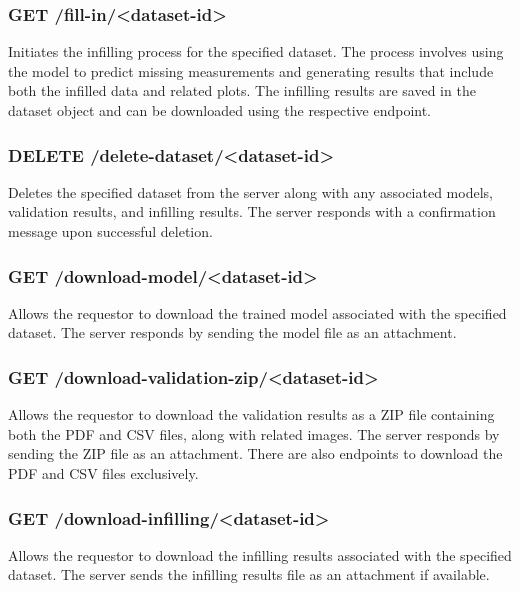 \subsubsection*{GET /fill-in/<dataset-id>}

Initiates the infilling process for the specified dataset.
The process involves using the model to predict missing measurements and generating results that include both the infilled data and related plots.
The infilling results are saved in the dataset object and can be downloaded using the respective endpoint.

\subsubsection*{DELETE /delete-dataset/<dataset-id>}

Deletes the specified dataset from the server along with any associated models, validation results, and infilling results.
The server responds with a confirmation message upon successful deletion.

\subsubsection*{GET /download-model/<dataset-id>}

Allows the requestor to download the trained model associated with the specified dataset.
The server responds by sending the model file as an attachment.

\subsubsection*{GET /download-validation-zip/<dataset-id>}

Allows the requestor to download the validation results as a ZIP file containing both the PDF and CSV files, along with related images.
The server responds by sending the ZIP file as an attachment. There are also endpoints to download the PDF and CSV files exclusively.

\subsubsection*{GET /download-infilling/<dataset-id>}

Allows the requestor to download the infilling results associated with the specified dataset.
The server sends the infilling results file as an attachment if available.